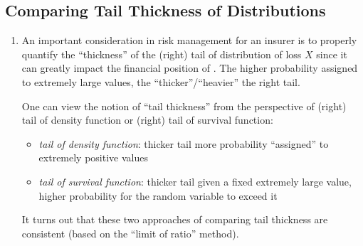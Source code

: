 \subsection{Comparing Tail Thickness of Distributions}
\begin{enumerate}
\item An important consideration in risk management for an insurer
 is to properly quantify the ``thickness'' of the (right) tail
of distribution of loss \(X\) since it can greatly impact the financial
position of . The higher probability assigned to extremely
large values, the ``thicker''/``heavier'' the right tail.

\begin{center}
\end{center}
\begin{note}
One can view the notion of ``tail thickness'' from the perspective of (right)
tail of density function or (right) tail of survival function:
\begin{itemize}
\item \emph{tail of density function}: thicker tail  more probability ``assigned'' to extremely positive values
\item \emph{tail of survival function}: thicker tail  given
a fixed extremely large value, higher probability for the random variable to
exceed it
\end{itemize}
It turns out that these two approaches of comparing tail thickness are
consistent (based on the ``limit of ratio'' method).

\end{note}
\end{enumerate}
